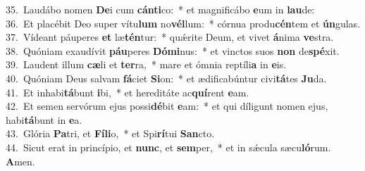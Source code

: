 {35.~}Laudábo nomen \textbf{De}i cum \textbf{cán}\textbf{ti}co:~* et magnificábo \textbf{e}um in \textbf{lau}de:\\
{36.~}Et placébit Deo super vítu\textbf{lum} no\textbf{vél}lum:~* córnua produ\textbf{cén}tem et \textbf{ún}gulas.\\
{37.~}Vídeant páuperes \textbf{et} læ\textbf{tén}tur:~* quǽrite Deum, et vivet \textbf{á}nima \textbf{ve}stra.\\
{38.~}Quóniam exaudívit \textbf{páu}peres \textbf{Dó}\textbf{mi}nus:~* et vinctos suos \textbf{non} de\textbf{spé}xit.\\
{39.~}Laudent illum \textbf{cæ}li et \textbf{ter}ra,~* mare et ómnia reptíli\textbf{a} in \textbf{e}is.\\
{40.~}Quóniam Deus salvam \textbf{fá}ciet \textbf{Si}on:~* et ædificabúntur civi\textbf{tá}tes \textbf{Ju}da.\\
{41.~}Et inhabi\textbf{tá}bunt \textbf{i}bi,~* et hereditáte ac\textbf{quí}rent \textbf{e}am.\\
{42.~}Et semen servórum ejus possi\textbf{dé}bit \textbf{e}am:~* et qui díligunt nomen ejus, habi\textbf{tá}bunt in \textbf{e}a.\\
{43.~}Glória \textbf{Pa}tri, et \textbf{Fí}\textbf{li}o,~* et Spi\textbf{rí}tui \textbf{San}cto.\\
{44.~}Sicut erat in princípio, et \textbf{nunc}, et \textbf{sem}per,~* et in sǽcula sæcu\textbf{ló}rum. \textbf{A}men.\\
